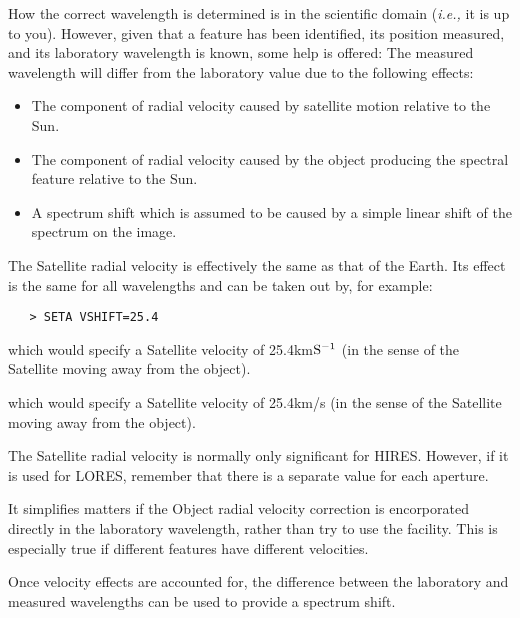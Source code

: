 How the correct wavelength is determined is in the scientific domain
({\it{i.e.,}} it is up to you).  However, given that a feature has been
identified, its position measured, and its laboratory wavelength is known,
some help is offered: The measured wavelength will differ from the laboratory
value due to the following effects:

\begin{itemize}

\item The component of radial velocity caused by satellite motion relative
      to the Sun.

\item The component of radial velocity caused by the object producing the
      spectral feature relative to the Sun.

\item A spectrum shift which is assumed to be caused by a simple linear
      shift of the spectrum on the image.

\end{itemize}

The Satellite radial velocity is effectively the same as that of the Earth.
Its effect is the same for all wavelengths and can be taken out by, for
example:

\begin{verbatim}
   > SETA VSHIFT=25.4
\end{verbatim}

\begin{latexonly}
which would specify a Satellite velocity of 25.4km${\rm S}^{-1}$ (in the
sense of the Satellite moving away from the object)\@.
\end{latexonly}

\begin{htmlonly}
which would specify a Satellite velocity of 25.4km/s (in the
sense of the Satellite moving away from the object)\@.
\end{htmlonly}

The Satellite radial velocity is normally only significant for HIRES\@.
However, if it is used for LORES, remember that there is a separate value
for each aperture.

It simplifies matters if the Object radial velocity correction is encorporated
directly in the laboratory wavelength, rather than try to use the
facility.  This is especially true if different features have different
velocities.

Once velocity effects are accounted for, the difference between the
laboratory and measured wavelengths can be used to provide a spectrum
shift.

